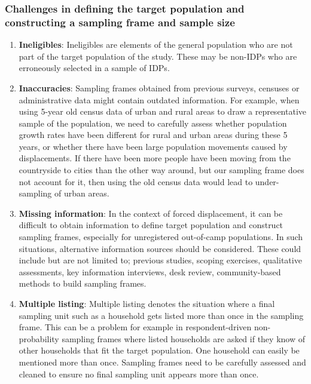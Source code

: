 \documentclass[
]{article}
\begin{document}
\hypertarget{b.2.-challenges-in-defining-the-target-population-and-constructing-a-sampling-frame-and-sample-size}{%
\subsubsection{Challenges in defining the target population and constructing a sampling frame and sample size}\label{b.2.-challenges-in-defining-the-target-population-and-constructing-a-sampling-frame-and-sample-size}}

\begin{enumerate}
\def\labelenumi{\arabic{enumi}.}
\setcounter{enumi}{141}
\item
  \textbf{Ineligibles}: Ineligibles are elements of the general population
  who are not part of the target population of the study. These may be
  non-IDPs who are erroneously selected in a sample of IDPs.
\item
  \textbf{Inaccuracies}: Sampling frames obtained from previous surveys,
  censuses or administrative data might contain outdated information.
  For example, when using 5-year old census data of urban and rural
  areas to draw a representative sample of the population, we need to
  carefully assess whether population growth rates have been different
  for rural and urban areas during these 5 years, or whether there
  have been large population movements caused by displacements. If
  there have been more people have been moving from the countryside to
  cities than the other way around, but our sampling frame does not
  account for it, then using the old census data would lead to
  under-sampling of urban areas.
\item
  \textbf{Missing information}: In the context of forced displacement, it
  can be difficult to obtain information to define target population
  and construct sampling frames, especially for unregistered
  out-of-camp populations. In such situations, alternative information
  sources should be considered. These could include but are not
  limited to; previous studies, scoping exercises, qualitative
  assessments, key information interviews, desk review,
  community-based methods to build sampling frames.
\item
  \textbf{Multiple listing}: Multiple listing denotes the situation where
  a final sampling unit such as a household gets listed more than once
  in the sampling frame. This can be a problem for example in
  respondent-driven non-probability sampling frames where listed
  households are asked if they know of other households that fit the
  target population. One household can easily be mentioned more than
  once. Sampling frames need to be carefully assessed and cleaned to
  ensure no final sampling unit appears more than once.
\end{enumerate}
\end{document}
